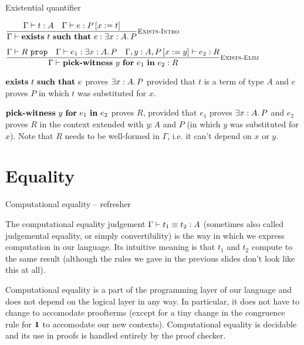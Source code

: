 \documentclass{beamer}
\begin{document}
\begin{frame}{Existential quantifier}

\begin{center}
  $\infrule[Exists-Intro]{\typing{t}{A} \quad \proves{e}{\subst{P}{x}{t}}}{\proves{\exintro{t}{e}}{\Ex{x}[A]{P}}}$

  \vspace{2em}

  $\infrule[Exists-Elim]{\prop{R} \quad \proves{e_1}{\Ex{x}[A]{P}} \quad \proves[\assume{\extend{\Gamma}{y}{A}}{\subst{P}{x}{y}}]{e_2}{R}}{\proves{\exelim{y}{e_1}{e_2}}{R}}$
\end{center}

\vspace{2em}

$\exintro{t}{e}$ proves $\Ex{x}[A]{P}$ provided that $t$ is a term of type $A$ and $e$ proves $P$ in which $t$ was substituted for $x$.

\vspace{2em}

$\textbf{pick-witness}\ y\ \textbf{for}\ e_1\ \textbf{in}\ e_2$ proves $R$, provided that $e_1$ proves $\Ex{x}[A]{P}$ and $e_2$ proves $R$ in the context extended with $y : A$ and $P$ (in which $y$ was substituted for $x$). Note that $R$ needs to be well-formed in $\Gamma$, i.e. it can't depend on $x$ or $y$.

\end{frame}

\section{Equality}

\begin{frame}{Computational equality -- refresher}

The computational equality judgement $\compeq{t_1}{t_2}{A}$ (sometimes also called judgemental equality, or simply convertibility) is the way in which we express computation in our language. Its intuitive meaning is that $t_1$ and $t_2$ compute to the same result (although the rules we gave in the previous slides don't look like this at all).

\vspace{2em}

Computational equality is a part of the programming layer of our language and does not depend on the logical layer in any way. In particular, it does not have to change to accomodate proofterms (except for a tiny change in the congruence rule for $\textbf{1}$ to accomodate our new contexts). Computational equality is decidable and its use in proofs is handled entirely by the proof checker.

\vspace{1em}

\end{frame}
\end{document}
